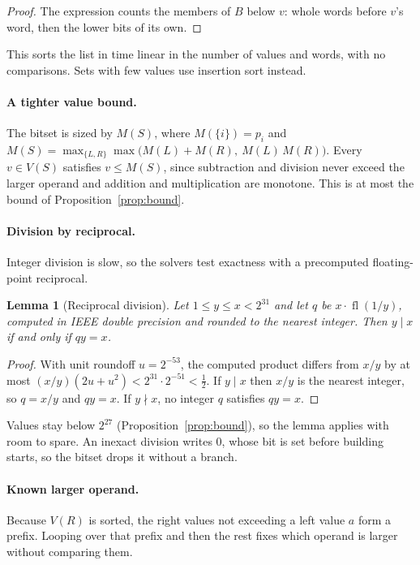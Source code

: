 \documentclass[11pt,a4paper]{article}
\newtheorem{lemma}[theorem]{Lemma}
\theoremstyle{definition}
\theoremstyle{remark}
\begin{document}
\begin{proof}
The expression counts the members of $B$ below $v$: whole words before $v$'s word, then the lower bits of its own.
\end{proof}

This sorts the list in time linear in the number of values and words, with no comparisons. Sets with
few values use insertion sort instead.

\paragraph{A tighter value bound.}
The bitset is sized by $M(S)$, where $M(\{i\}) = p_i$ and
$M(S) = \max_{\{L, R\}} \max\bigl(M(L) + M(R),\ M(L)\, M(R)\bigr)$. Every $v \in V(S)$ satisfies $v \le M(S)$, since
subtraction and division never exceed the larger operand and addition and multiplication are monotone.
This is at most the bound of Proposition~\ref{prop:bound}.

\paragraph{Division by reciprocal.}
Integer division is slow, so the solvers test exactness with a precomputed floating-point reciprocal.

\begin{lemma}[Reciprocal division]\label{lem:reciprocal}
Let $1 \le y \le x < 2^{31}$ and let $q$ be $x \cdot \operatorname{fl}(1/y)$, computed in IEEE double precision and
rounded to the nearest integer. Then $y \mid x$ if and only if $q y = x$.
\end{lemma}

\begin{proof}
With unit roundoff $u = 2^{-53}$, the computed product differs from $x / y$ by at most
$(x / y)(2u + u^2) < 2^{31} \cdot 2^{-51} < \tfrac12$. If $y \mid x$ then $x / y$ is the nearest integer, so
$q = x / y$ and $q y = x$. If $y \nmid x$, no integer $q$ satisfies $q y = x$.
\end{proof}

Values stay below $2^{27}$ (Proposition~\ref{prop:bound}), so the lemma applies with room to spare. An inexact
division writes $0$, whose bit is set before building starts, so the bitset drops it without a branch.

\paragraph{Known larger operand.}
Because $V(R)$ is sorted, the right values not exceeding a left value $a$ form a prefix. Looping over that
prefix and then the rest fixes which operand is larger without comparing them.
\end{document}
